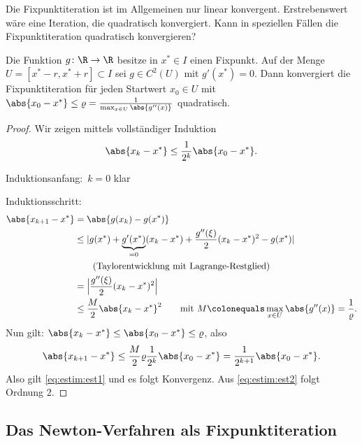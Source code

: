 Die Fixpunktiteration ist im Allgemeinen nur linear konvergent. Erstrebenswert wäre eine Iteration, die quadratisch konvergiert. \newline Kann in speziellen Fällen die Fixpunktiteration quadratisch konvergieren?
\begin{satz}
\label{thm:nichtlineare_gleichungen:fixpunkt_quadratische_konvergenz}
Die Funktion $g \colon \R \to \R$ besitze in $x^* \in I$ einen Fixpunkt.
Auf der Menge $U = [x^*-r,x^*+r] \subset I$ sei $g \in C^2 (U)$
mit $g' (x^*)=0$. Dann konvergiert die Fixpunktiteration für jeden Startwert $x_0 \in U$
mit $\abs{x_0-x^*} \leq \varrho=\frac{1}{\max_{x \in U} \abs{g^{\prime \prime}(x)}}$ quadratisch.
\end{satz}
\begin{proof}
Wir zeigen mittels vollständiger Induktion
\begin{equation}
\label{eq:estim:est1}
 \abs{x_k-x^*} \leq \frac{1}{2^k} \abs{x_0-x^*}.
\end{equation}

Induktionsanfang:\ $k=0$ klar

\medskip

Induktionsschritt:
\begin{align}
\nonumber
\abs{x_{k+1}-x^*}
& =
\abs{g(x_k)-g(x^*)} \\
%
\nonumber
& \leq
\vert g(x^*)+\underbrace{g'(x^*)}_{=0} (x_k-x^*)+\frac{g''( \xi)}{2} (x_k-x^*)^2-g (x^*) \vert \\
%
\nonumber
& \qquad \text{(Taylorentwicklung mit Lagrange-Restglied)} \\
%
\nonumber
& = \Big\vert \frac{g''(\xi)}{2} (x_k-x^*)^2 \Big\vert \\
%
\label{eq:estim:est2}
& \leq
\frac{M}{2} \abs{x_k-x^*}^2 \qquad \text{mit $M\colonequals\max_{x \in U} \abs{g'' (x)} = \frac{1}{\varrho}$}.
\end{align}
Nun gilt: $\abs{x_k-x^*} \leq \abs{x_0-x^*} \leq \varrho$, also
\begin{equation*}
 \abs{x_{k+1}-x^*}
 \leq
 \frac{M}{2} \varrho \frac{1}{2^k} \abs{x_0-x^*}
 =
 \frac{1}{2^{k+1}} \abs{x_0-x^*}.
\end{equation*}
Also gilt \eqref{eq:estim:est1} und es folgt Konvergenz. Aus \eqref{eq:estim:est2} folgt Ordnung $2$.
\end{proof}

\subsection{Das Newton-Verfahren als Fixpunktiteration}

